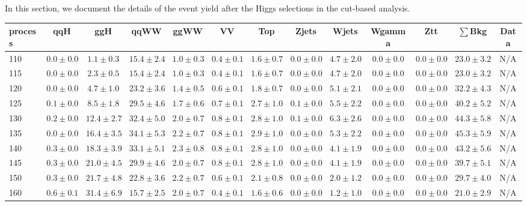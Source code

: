 In this section, we document the details of the event yield after the Higgs 
selections in the cut-based analysis.

\begin{table}
{%
 \tiny
 \begin{center}
 \begin{tabular}{l | c c | c c c c c c c c  | c c}
 \hline
 process & qqH & ggH & qqWW & ggWW & VV & Top & Zjets & Wjets & Wgamma & Ztt & $\sum$Bkg & Data \\
 \hline
110 & $0.0\pm0.0$ & $1.1\pm0.3$ & $15.4\pm2.4$ & $1.0\pm0.3$ & $0.4\pm0.1$ & $1.6\pm0.7$ & $0.0\pm0.0$ & $4.7\pm2.0$ & $0.0\pm0.0$ & $0.0\pm0.0$ & $23.0\pm3.2$ & N/A \\
115 & $0.0\pm0.0$ & $2.3\pm0.5$ & $15.4\pm2.4$ & $1.0\pm0.3$ & $0.4\pm0.1$ & $1.6\pm0.7$ & $0.0\pm0.0$ & $4.7\pm2.0$ & $0.0\pm0.0$ & $0.0\pm0.0$ & $23.0\pm3.2$ & N/A \\
120 & $0.0\pm0.0$ & $4.7\pm1.0$ & $23.2\pm3.6$ & $1.4\pm0.5$ & $0.6\pm0.1$ & $1.8\pm0.7$ & $0.0\pm0.0$ & $5.1\pm2.1$ & $0.0\pm0.0$ & $0.0\pm0.0$ & $32.2\pm4.3$ & N/A \\
125 & $0.1\pm0.0$ & $8.5\pm1.8$ & $29.5\pm4.6$ & $1.7\pm0.6$ & $0.7\pm0.1$ & $2.7\pm1.0$ & $0.1\pm0.0$ & $5.5\pm2.2$ & $0.0\pm0.0$ & $0.0\pm0.0$ & $40.2\pm5.2$ & N/A \\
130 & $0.2\pm0.0$ & $12.4\pm2.7$ & $32.4\pm5.0$ & $2.0\pm0.7$ & $0.8\pm0.1$ & $2.8\pm1.0$ & $0.1\pm0.0$ & $6.3\pm2.6$ & $0.0\pm0.0$ & $0.0\pm0.0$ & $44.3\pm5.8$ & N/A \\
135 & $0.0\pm0.0$ & $16.4\pm3.5$ & $34.1\pm5.3$ & $2.2\pm0.7$ & $0.8\pm0.1$ & $2.9\pm1.0$ & $0.0\pm0.0$ & $5.3\pm2.2$ & $0.0\pm0.0$ & $0.0\pm0.0$ & $45.3\pm5.9$ & N/A \\
140 & $0.3\pm0.0$ & $18.3\pm3.9$ & $33.1\pm5.1$ & $2.3\pm0.8$ & $0.8\pm0.1$ & $2.8\pm1.0$ & $0.0\pm0.0$ & $4.1\pm1.9$ & $0.0\pm0.0$ & $0.0\pm0.0$ & $43.2\pm5.6$ & N/A \\
145 & $0.3\pm0.0$ & $21.0\pm4.5$ & $29.9\pm4.6$ & $2.0\pm0.7$ & $0.8\pm0.1$ & $2.8\pm1.0$ & $0.0\pm0.0$ & $4.1\pm1.9$ & $0.0\pm0.0$ & $0.0\pm0.0$ & $39.7\pm5.1$ & N/A \\
150 & $0.3\pm0.0$ & $21.7\pm4.8$ & $22.8\pm3.6$ & $2.2\pm0.7$ & $0.6\pm0.1$ & $2.1\pm0.8$ & $0.0\pm0.0$ & $2.0\pm1.2$ & $0.0\pm0.0$ & $0.0\pm0.0$ & $29.7\pm4.0$ & N/A \\
160 & $0.6\pm0.1$ & $31.4\pm6.9$ & $15.7\pm2.5$ & $2.0\pm0.7$ & $0.4\pm0.1$ & $1.6\pm0.6$ & $0.0\pm0.0$ & $1.2\pm1.0$ & $0.0\pm0.0$ & $0.0\pm0.0$ & $21.0\pm2.9$ & N/A \\

\end{tabular}
\end{center}}
\end{table}
